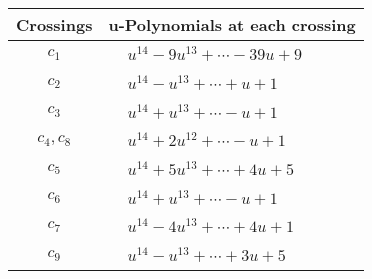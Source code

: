 \documentclass[1p]{elsarticle_modified}
\theoremstyle{definition}
\begin{document}
\begin{tabular}{m{50pt}|m{274pt}}
Crossings & \hspace{64pt}u-Polynomials at each crossing \\
\hline $$\begin{aligned}c_{1}\end{aligned}$$&$\begin{aligned}
&u^{14}-9 u^{13}+\cdots-39 u+9
\end{aligned}$\\
\hline $$\begin{aligned}c_{2}\end{aligned}$$&$\begin{aligned}
&u^{14}- u^{13}+\cdots+u+1
\end{aligned}$\\
\hline $$\begin{aligned}c_{3}\end{aligned}$$&$\begin{aligned}
&u^{14}+u^{13}+\cdots- u+1
\end{aligned}$\\
\hline $$\begin{aligned}c_{4},c_{8}\end{aligned}$$&$\begin{aligned}
&u^{14}+2 u^{12}+\cdots- u+1
\end{aligned}$\\
\hline $$\begin{aligned}c_{5}\end{aligned}$$&$\begin{aligned}
&u^{14}+5 u^{13}+\cdots+4 u+5
\end{aligned}$\\
\hline $$\begin{aligned}c_{6}\end{aligned}$$&$\begin{aligned}
&u^{14}+u^{13}+\cdots- u+1
\end{aligned}$\\
\hline $$\begin{aligned}c_{7}\end{aligned}$$&$\begin{aligned}
&u^{14}-4 u^{13}+\cdots+4 u+1
\end{aligned}$\\
\hline $$\begin{aligned}c_{9}\end{aligned}$$&$\begin{aligned}
&u^{14}- u^{13}+\cdots+3 u+5
\end{aligned}$\\

\end{tabular}
\end{document}
